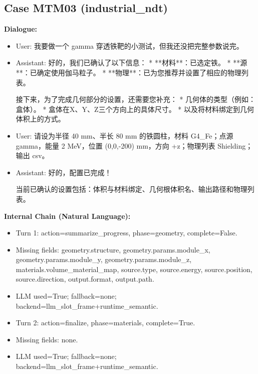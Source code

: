 \documentclass[11pt]{ctexart}
\begin{document}
\subsection{Case MTM03 (industrial\_ndt)}
\textbf{Dialogue:}
\begin{itemize}
\item User: 我要做一个 gamma 穿透铁靶的小测试，但我还没把完整参数说完。
\item Assistant: 好的，我们已确认了以下信息：
*   **材料**：已选定铁。
*   **源**：已确定使用伽马粒子。
*   **物理**：已为您推荐并设置了相应的物理列表。

接下来，为了完成几何部分的设置，还需要您补充：
*   几何体的类型（例如：盒体）。
*   盒体在X、Y、Z三个方向上的具体尺寸。
*   以及将材料绑定到几何体积上的方式。
\item User: 请设为半径 40 mm、半长 80 mm 的铁圆柱，材料 G4\_Fe；点源 gamma，能量 2 MeV，位置 (0,0,-200) mm，方向 +z；物理列表 Shielding；输出 csv。
\item Assistant: 好的，配置已完成！

当前已确认的设置包括：体积与材料绑定、几何根体积名、输出路径和物理列表。
\end{itemize}
\textbf{Internal Chain (Natural Language):}
\begin{itemize}
\item Turn 1: action=summarize\_progress, phase=geometry, complete=False.
\item Missing fields: geometry.structure, geometry.params.module\_x, geometry.params.module\_y, geometry.params.module\_z, materials.volume\_material\_map, source.type, source.energy, source.position, source.direction, output.format, output.path.
\item LLM used=True; fallback=none; backend=llm\_slot\_frame+runtime\_semantic.
\item Turn 2: action=finalize, phase=materials, complete=True.
\item Missing fields: none.
\item LLM used=True; fallback=none; backend=llm\_slot\_frame+runtime\_semantic.
\end{itemize}
\end{document}
